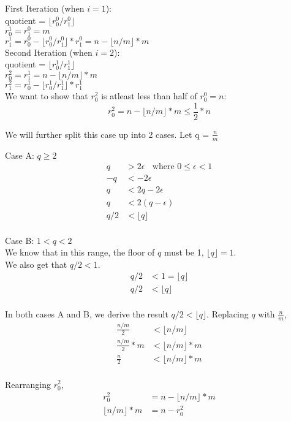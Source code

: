 \documentclass{article}
\newcommand{\floor}[1]{\lfloor #1 \rfloor}
\begin{document}
\begin{enumerate}
	 First Iteration (when $i = 1$):\\
	 quotient = $\floor{r_0^0 / r_1^0}$\\
	 $r_0^1 = r_1^0 = m$\\
	 $r_1^1 = r_0^0 - \floor{r_0^0 / r_1^0} * r_1^0 = n - \floor{n/m} * m$\\
	 
	 Second Iteration (when $i = 2$):\\
	 quotient = $\floor{r_0^1 / r_1^1}$\\
	 $r_0^2 = r_1^1 = n - \floor{n/m} * m $\\
	 $r_1^2 = r_0^1 - \floor{r_0^1 / r_1^1} * r_1^1$\\
	 
	We want to show that $r_0^2$ is atleast less than half of $r_0^0 = n$:
	$$r_0^2 = n - \floor{n/m} * m \leq \frac{1}{2} * n$$
	
	We will further split this case up into 2 cases.
	Let q = $\frac{n}{m}$
	
	Case A: $q \geq 2$
	\begin{align*}
	q &> 2\epsilon \ \ \ \ \text{where $0 \leq \epsilon < 1$}\\
	- q &< -2\epsilon \\
	q &< 2q - 2\epsilon \\
	q &< 2(q - \epsilon) \\
	q/2 &< \floor q \\
	\end{align*}
	
	Case B: $1 < q < 2$\\
	We know that in this range, the floor of $q$ must be 1, $\floor q = 1$.\\
	We also get that $q/2 < 1$.
	\begin{align*}
	q/2 &< 1 = \floor q\\
	q/2 &< \floor q\\
	\end{align*}
	
	In both cases A and B, we derive the result $q/2 < \floor q$. Replacing $q$ with $\frac{n}{m}$, 
	\begin{align*}
	\frac{n/m}{2} &< \floor{n/m}\\
	\frac{n/m}{2} * m &< \floor{n/m} * m\\
	\frac{n}{2} &< \floor{n/m} * m\\
	\end{align*}
	
	Rearranging $r_0^2$, 
	\begin{align*}
	r_0^2 &= n - \floor{n/m} * m \\
	\floor{n/m} * m &= n - r_0^2 \\
	\end{align*}
	

\end{enumerate}
\end{document}

